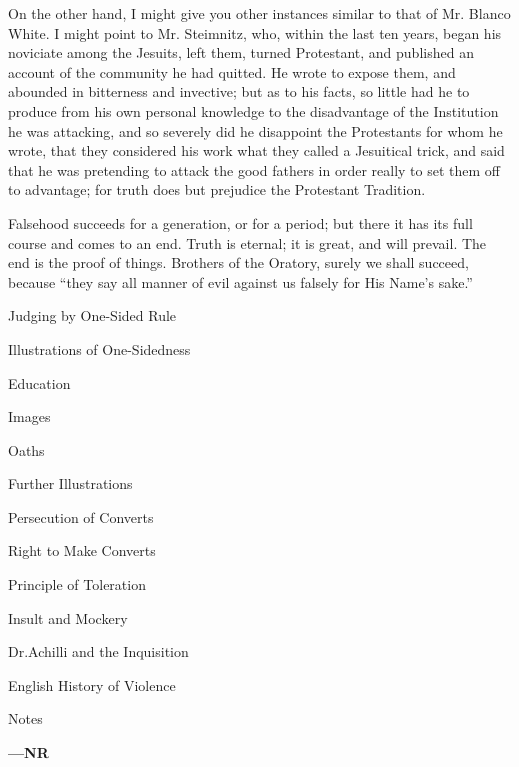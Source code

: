 On the other hand, I might give you other instances
similar to that of Mr. Blanco White. I might point to Mr.
Steimnitz, who, within the last ten years, began his
noviciate among the Jesuits, left them, turned
Protestant, and published an account of the community he
had quitted. He wrote to expose them, and abounded in
bitterness and invective; but as to his facts, so little
had he to produce from his own personal knowledge to the
disadvantage of the Institution he was attacking, and so
severely did he disappoint the Protestants for whom he
wrote, that they considered his work what they called a
Jesuitical trick, and said that he was pretending to
attack the good fathers in order really to set them off
to advantage; for truth does but prejudice the Protestant
Tradition.

Falsehood succeeds for a generation, or for a period;
but there it has its full course and comes to an end.
Truth is eternal; it is great, and will prevail. The end
is the proof of things. Brothers of the Oratory, surely
we shall succeed, because ``they say all manner of
evil against us falsely for His Name's sake.''


Judging by One-Sided Rule

Illustrations of
One-Sidedness

Education

Images

Oaths

Further Illustrations

Persecution of
Converts

Right to Make
Converts

Principle of
Toleration

Insult and Mockery

Dr.Achilli and
the Inquisition

English History of
Violence

Notes

\textbf{—NR}

